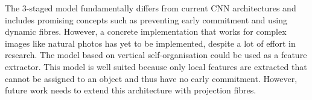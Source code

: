 The $3$-staged model fundamentally differs from current CNN architectures and includes promising concepts such as preventing early commitment and using dynamic fibres. However, a concrete implementation that works for complex images like natural photos has yet to be implemented, despite a lot of effort in research. The model based on vertical self-organisation could be used as a feature extractor. This model is well suited because only local features are extracted that cannot be assigned to an object and thus have no early commitment. However, future work needs to extend this architecture with projection fibres.  %

